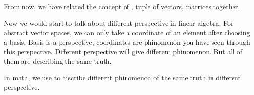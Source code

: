 
\newcommand\map[3]{#1:{#2}\longrightarrow  {#3}}
\newcommand\maps[5]{{#1}:{#2}\longrightarrow {#3},{#4} \mapsto {#5}}

From now, we have related the concept of \lt, tuple of vectors, matrices together. 

\vfill

Now we would start to talk about different perspective in linear algebra. For abstract vector spaces, we can only take a coordinate of an element after choosing a basis. Basis is a perspective, coordinates are phinomenon you have seen through this perspective. Different perspective will give different phinomenon. But all of them are describing the same truth. 

In math, we use  to discribe different phinomenon of the same truth in different perspective.
\vfill
